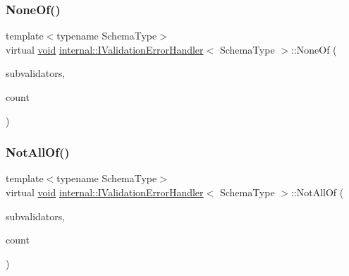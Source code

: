 \subsubsection{\texorpdfstring{None\+Of()}{NoneOf()}}
{\footnotesize\ttfamily template$<$typename Schema\+Type$>$ \\
virtual \hyperlink{imgui__impl__opengl3__loader_8h_ac668e7cffd9e2e9cfee428b9b2f34fa7}{void} \hyperlink{classinternal_1_1IValidationErrorHandler}{internal\+::\+I\+Validation\+Error\+Handler}$<$ Schema\+Type $>$\+::None\+Of (\begin{DoxyParamCaption}\item[{\hyperlink{classinternal_1_1ISchemaValidator}{I\+Schema\+Validator} $\ast$$\ast$}]{subvalidators,  }\item[{\hyperlink{rapidjson_8h_a5ed6e6e67250fadbd041127e6386dcb5}{Size\+Type}}]{count }\end{DoxyParamCaption})\hspace{0.3cm}{\ttfamily [pure virtual]}}

\mbox{\label{classinternal_1_1IValidationErrorHandler_a3ce77d66a09eb5d91833fc86f8fa5680}} 
\subsubsection{\texorpdfstring{Not\+All\+Of()}{NotAllOf()}}
{\footnotesize\ttfamily template$<$typename Schema\+Type$>$ \\
virtual \hyperlink{imgui__impl__opengl3__loader_8h_ac668e7cffd9e2e9cfee428b9b2f34fa7}{void} \hyperlink{classinternal_1_1IValidationErrorHandler}{internal\+::\+I\+Validation\+Error\+Handler}$<$ Schema\+Type $>$\+::Not\+All\+Of (\begin{DoxyParamCaption}\item[{\hyperlink{classinternal_1_1ISchemaValidator}{I\+Schema\+Validator} $\ast$$\ast$}]{subvalidators,  }\item[{\hyperlink{rapidjson_8h_a5ed6e6e67250fadbd041127e6386dcb5}{Size\+Type}}]{count }\end{DoxyParamCaption})\hspace{0.3cm}{\ttfamily [pure virtual]}}

\mbox{\label{classinternal_1_1IValidationErrorHandler_a195a561f0bbbfb66961c9331a6afab39}} 
